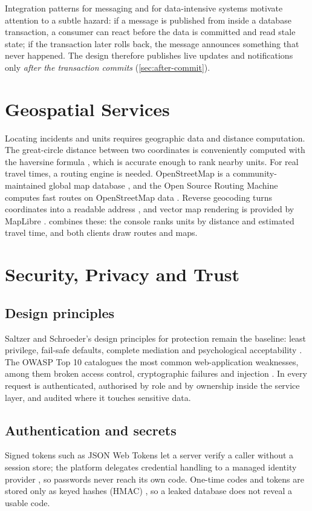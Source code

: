 Integration patterns for messaging \cite{hohpe2003eip} and for data-intensive systems \cite{kleppmann2017ddia}
motivate attention to a subtle hazard: if a message is published from inside a database transaction, a consumer can react
before the data is committed and read stale state; if the transaction later rolls back, the message announces
something that never happened. The design therefore publishes live updates and notifications only \emph{after the
transaction commits} (\cref{sec:after-commit}).

\section{Geospatial Services}

Locating incidents and units requires geographic data and distance computation. The great-circle distance between
two coordinates is conveniently computed with the haversine formula \cite{sinnott1984haversine}, which is accurate
enough to rank nearby units. For real travel times, a routing engine is needed. OpenStreetMap is a
community-maintained global map database \cite{haklay2008osm}, and the Open Source Routing Machine computes fast
routes on OpenStreetMap data \cite{luxen2011osrm}. Reverse geocoding turns coordinates into a readable address
\cite{nominatim}, and vector map rendering is provided by MapLibre \cite{maplibre}. \ProjectName{} combines
these: the console ranks units by distance and estimated travel time, and both clients draw routes and maps.

\section{Security, Privacy and Trust}

\subsection{Design principles}
Saltzer and Schroeder's design principles for protection remain the baseline: least privilege, fail-safe
defaults, complete mediation and psychological acceptability \cite{saltzer1975protection}. The OWASP Top 10
catalogues the most common web-application weaknesses, among them broken access control, cryptographic failures
and injection \cite{owasp2021top10}. In \ProjectName{} every request is authenticated, authorised by role and by
ownership inside the service layer, and audited where it touches sensitive data.

\subsection{Authentication and secrets}
Signed tokens such as JSON Web Tokens \cite{rfc7519} let a server verify a caller without a session store; the
platform delegates credential handling to a managed identity provider \cite{firebase}, so passwords never reach its
own code. One-time codes and tokens are stored only as keyed hashes (HMAC) \cite{rfc2104}, so a leaked database does
not reveal a usable code.


